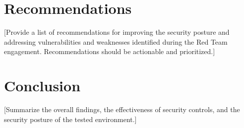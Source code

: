 \section{Recommendations}
[Provide a list of recommendations for improving the security posture and addressing vulnerabilities and weaknesses identified during the Red Team engagement. Recommendations should be actionable and prioritized.]
\section{Conclusion}
[Summarize the overall findings, the effectiveness of security controls, and the security posture of the tested environment.]
